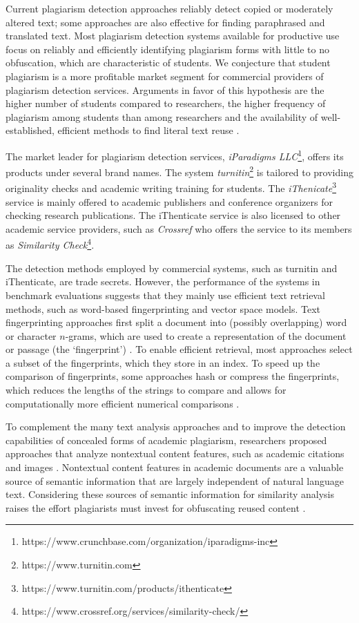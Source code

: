 \documentclass{llncs}
\begin{document}
Current plagiarism detection approaches reliably detect copied or moderately altered text; some approaches are also effective for finding paraphrased and translated text. Most plagiarism detection systems available for productive use focus on reliably and efficiently identifying plagiarism forms with little to no obfuscation, which are characteristic of students. We conjecture that student plagiarism is a more profitable market segment for commercial providers of plagiarism detection services. Arguments in favor of this hypothesis are the higher number of students compared to researchers, the higher frequency of plagiarism among students than among researchers \cite{Swazey93,McCabe05} and the availability of well-established, efficient methods to find literal text reuse \cite{Meuschke13,Eisa2015,Gupta2016}.

The market leader for plagiarism detection services, \textit{iParadigms LLC}\footnote{https://www.crunchbase.com/organization/iparadigms-inc}, offers its products under several brand names. The system \textit{turnitin}\footnote{https://www.turnitin.com} is tailored to providing originality checks and academic writing training for students. The \textit{iThenicate}\footnote{https://www.turnitin.com/products/ithenticate} service is mainly offered to academic publishers and conference organizers for checking research publications. The iThenticate service is also licensed to other academic service providers, such as \textit{Crossref} who offers the service to its members as \textit{Similarity Check}\footnote{https://www.crossref.org/services/similarity-check/}.

The detection methods employed by commercial systems, such as turnitin and iThenticate, are trade secrets. However, the performance of the systems in benchmark evaluations \cite{HTW-PDS} suggests that they mainly use efficient text retrieval methods, such as word-based fingerprinting and vector space models. Text fingerprinting approaches first split a document into (possibly overlapping) word or character $n$-grams, which are used to create a representation of the document or passage (the ‘fingerprint’) \cite{Meuschke13}. To enable efficient retrieval, most approaches select a subset of the fingerprints, which they store in an index. To speed up the comparison of fingerprints, some approaches hash or compress the fingerprints, which reduces the lengths of the strings to compare and allows for computationally more efficient numerical comparisons \cite{Foltynek2019}.

To complement the many text analysis approaches and to improve the detection capabilities of concealed forms of academic plagiarism, researchers proposed approaches that analyze nontextual content features, such as academic citations \cite{Gipp11,Gipp11c,Gipp2014,gipp14a,Gipp13b,Meuschke14,Pertile2016}
and images \cite{Meuschke2018}. Nontextual content features in academic documents are a valuable source of semantic information that are largely independent of natural language text. Considering these sources of semantic information for similarity analysis raises the effort plagiarists must invest for obfuscating reused content \cite{Meuschke14,Meuschke2019}.
\end{document}
